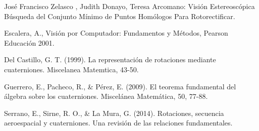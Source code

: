\documentclass[spanish]{article}
\begin{document}
  \begin{thebibliography}{99} 
  
  José Francisco Zelasco , Judith Donayo, Teresa Arcomano: Visión Estereoscópica Búsqueda del Conjunto Mínimo de Puntos Homólogos Para Rotorectificar.
  
  Escalera, A., Visión por Computador: Fundamentos y Métodos, Pearson Educación 2001.
  
  Del Castillo, G. T. (1999). La representación de rotaciones mediante cuaterniones. Miscelanea Matemtica, 43-50.
  
  Guerrero, E., Pacheco, R., & Pérez, E. (2009). El teorema fundamental del álgebra sobre los cuaterniones. Miscelánea Matemática, 50, 77-88.
  
  Serrano, E., Sirne, R. O., & La Mura, G. (2014). Rotaciones, secuencia aeroespacial y cuaterniones. Una revisión de las relaciones fundamentales.

  \end{thebibliography}
\end{document}
